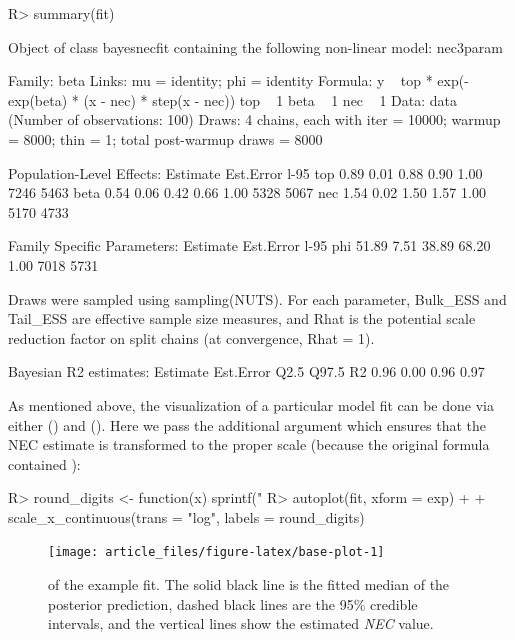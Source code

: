 \documentclass[
  shortnames]{jss}
\begin{document}
\begin{CodeChunk}
\begin{CodeInput}
R> summary(fit)
\end{CodeInput}
\begin{CodeOutput}
Object of class bayesnecfit containing the following non-linear model: nec3param

 Family: beta 
  Links: mu = identity; phi = identity 
Formula: y ~ top * exp(-exp(beta) * (x - nec) * step(x - nec)) 
         top ~ 1
         beta ~ 1
         nec ~ 1
   Data: data (Number of observations: 100) 
  Draws: 4 chains, each with iter = 10000; warmup = 8000; thin = 1;
         total post-warmup draws = 8000

Population-Level Effects: 
     Estimate Est.Error l-95%
top      0.89      0.01     0.88     0.90 1.00     7246     5463
beta     0.54      0.06     0.42     0.66 1.00     5328     5067
nec      1.54      0.02     1.50     1.57 1.00     5170     4733

Family Specific Parameters: 
    Estimate Est.Error l-95%
phi    51.89      7.51    38.89    68.20 1.00     7018     5731

Draws were sampled using sampling(NUTS). For each parameter, Bulk_ESS
and Tail_ESS are effective sample size measures, and Rhat is the potential
scale reduction factor on split chains (at convergence, Rhat = 1).


Bayesian R2 estimates:
   Estimate Est.Error Q2.5 Q97.5
R2     0.96      0.00 0.96  0.97
\end{CodeOutput}
\end{CodeChunk}

As mentioned above, the visualization of a particular model fit can be done via either   () and  \citep{ggplot} (). Here we pass the additional argument  which ensures that the NEC estimate is transformed to the proper scale (because the original formula contained ):

\begin{CodeChunk}
\begin{CodeInput}
R> round_digits <- function(x) sprintf("%
R> autoplot(fit, xform = exp) +
+   scale_x_continuous(trans = "log", labels = round_digits)
\end{CodeInput}
\begin{figure}[!ht]

{\centering \texttt{[image: article\_files/figure-latex/base-plot-1]} 

}

\caption{  of the example fit. The solid black line is the fitted median of the posterior prediction, dashed black lines are the 95\% credible intervals, and the vertical lines show the estimated \textit{NEC} value.}\label{fig:base-plot}
\end{figure}
\end{CodeChunk}
\end{document}
